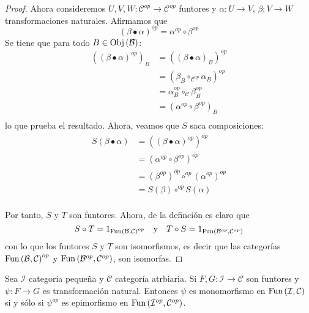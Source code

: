 \documentclass[12pt]{report}
\newcounter{it}
\theoremstyle{largebreak}
\newcommand\cf[3]{\ensuremath{#1:#2\rightarrow#3}}
\newcommand{\Obj}[1]{\ensuremath{\textup{Obj}\left(#1\right)}}
\newcommand{\Fun}[2]{\ensuremath{\textup{Fun}\left(#1,#2\right)}}
\begin{document}
\begin{proof}
        Ahora consideremos $\cf{U,V,W}{\mathcal{C}^{op}}{\mathcal{C}^{op}}$ funtores y $\cf{\alpha}{U}{V}$, $\cf{\beta}{V}{W}$ transformaciones naturales. Afirmamos que
        \begin{equation*}
            (\beta\bullet\alpha)^{op}=\alpha^{op}\circ\beta^{op}
        \end{equation*}
        Se tiene que para todo $B\in\Obj{\mathcal{B}}$:
        \begin{equation*}
            \begin{split}
                ((\beta\bullet\alpha)^{op})_B&=((\beta\bullet\alpha)_B)^{op}\\
                &=(\beta_B\circ_{\mathcal{C}^{op}}\alpha_B)^{op}\\
                &=\alpha_B^{op}\circ_\mathcal{C}\beta_B^{op}\\
                &=(\alpha^{op}\circ\beta^{op})_B\\
            \end{split}
        \end{equation*}
        lo que prueba el resultado. Ahora, veamos que $S$ saca composiciones:
        \begin{equation*}
            \begin{split}
                S(\beta\bullet\alpha)&=((\beta\bullet\alpha)^{op})^{\overline{op}}\\
                &=(\alpha^{op}\circ\beta^{op})^{\overline{op}}\\
                &=(\beta^{op})^{\overline{op}}\circ^{op}(\alpha^{op})^{\overline{op}}\\
                &=S(\beta)\circ^{op}S(\alpha)\\
            \end{split}
        \end{equation*}

        Por tanto, $S$ y $T$ son funtores. Ahora, de la definción es claro que
        \begin{equation*}
            S\circ T=1_{\Fun{\mathcal{B}}{\mathcal{C}}^{op}}\quad\textup{y}\quad T\circ S=1_{\Fun{\mathcal{B}^{op}}{\mathcal{C}^{op}}}
        \end{equation*}
        con lo que los funtores $S$ y $T$ son isomorfismos, es decir que las categorías $\Fun{\mathcal{B}}{\mathcal{C}}^{op}$ y $\Fun{\mathcal{B}^{op}}{\mathcal{C}^{op}}$, son isomorfas.
    \end{proof}

    \begin{cor}
        Sea $\mathcal{I}$ categoría pequeña y $\mathcal{C}$ categoría atrbiaria. Si $\cf{F,G}{\mathcal{I}}{\mathcal{C}}$ son funtores y $\cf{\psi}{F}{G}$ es transformación natural. Entonces $\psi$ es monomorfismo en $\Fun{\mathcal{I}}{\mathcal{C}}$ si y sólo si $\psi^{op}$ es epimorfismo en $\Fun{\mathcal{I}^{op}}{\mathcal{C}^{op}}$.
    \end{cor}
\end{document}
